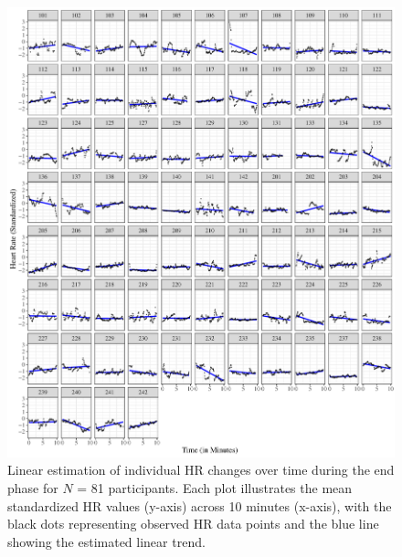 \documentclass[preprint,
3p]{elsarticle} %
\begin{document}
\begin{figure}[htbp]
  \centering
  \includegraphics[width=1\textwidth]{plots_publication/plot_end_appendix.pdf}
    \caption{Linear estimation of individual HR changes over time during the end phase for $N$ = 81 participants. Each plot illustrates the mean standardized HR values (y-axis) across 10 minutes (x-axis), with the black dots representing observed HR data points and the blue line showing the estimated linear trend.}
  \label{fig.a7}
\end{figure}

\newpage
\end{document}
